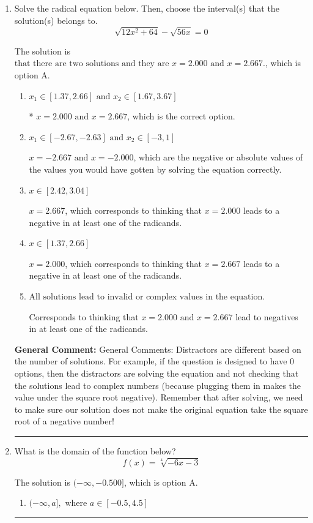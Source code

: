 \documentclass{extbook}[14pt]
\newcommand{\litem}[1]{\item #1

\rule{\textwidth}{0.4pt}}
\begin{document}
\begin{enumerate}\litem{
Solve the radical equation below. Then, choose the interval(s) that the solution(s) belongs to.
\[ \sqrt{12 x^2 + 64} - \sqrt{56 x} = 0 \]

The solution is \( \text{that there are two solutions and they are } x = 2.000 \text{ and } x = 2.667. \), which is option A.\begin{enumerate}[label=\Alph*.]
\item \( x_1 \in [1.37, 2.66] \text{ and } x_2 \in [1.67,3.67] \)

* $x = 2.000 \text{ and } x = 2.667$, which is the correct option.
\item \( x_1 \in [-2.67, -2.63] \text{ and } x_2 \in [-3,1] \)

$x = -2.667 \text{ and } x = -2.000$, which are the negative or absolute values of the values you would have gotten by solving the equation correctly.
\item \( x \in [2.42,3.04] \)

$x = 2.667$, which corresponds to thinking that $x = 2.000$ leads to a negative in at least one of the radicands.
\item \( x \in [1.37,2.66] \)

$x = 2.000$, which corresponds to thinking that $x = 2.667$ leads to a negative in at least one of the radicands.
\item \( \text{All solutions lead to invalid or complex values in the equation.} \)

Corresponds to thinking that $x = 2.000 \text{ and } x = 2.667$ lead to negatives in at least one of the radicands.
\end{enumerate}

\textbf{General Comment:} General Comments: Distractors are different based on the number of solutions. For example, if the question is designed to have 0 options, then the distractors are solving the equation and not checking that the solutions lead to complex numbers (because plugging them in makes the value under the square root negative). Remember that after solving, we need to make sure our solution does not make the original equation take the square root of a negative number!
}
\litem{
What is the domain of the function below?
\[ f(x) = \sqrt[4]{-6 x - 3} \]

The solution is \( (-\infty, -0.500] \), which is option A.\begin{enumerate}[label=\Alph*.]
\item \( (-\infty, a], \text{ where } a \in [-0.5, 4.5] \)


\end{enumerate}}
\end{enumerate}
\end{document}

